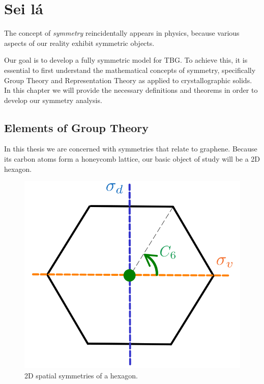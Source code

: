 



\chapter{Sei lá}

The concept of \textit{symmetry} reincidentally appears in physics, because various aspects of our reality exhibit symmetric objects.

Our goal is to develop a fully symmetric model for TBG. To achieve this, it is essential to first understand the mathematical concepts of symmetry, specifically Group Theory and Representation Theory as applied to crystallographic solids. In this chapter we will provide the necessary definitions and theorems in order to develop our symmetry analysis.

\section{Elements of Group Theory}


In this thesis we are concerned with symmetries that relate to graphene. Because its carbon atoms form a honeycomb lattice, our basic object of study will be a 2D hexagon.

\begin{figure}[H]
\centering
\includegraphics[width=0.4\linewidth]{fig/hexagon.png}
\caption{2D spatial symmetries of a hexagon.}
\label{fig:hexagon}
\end{figure}

